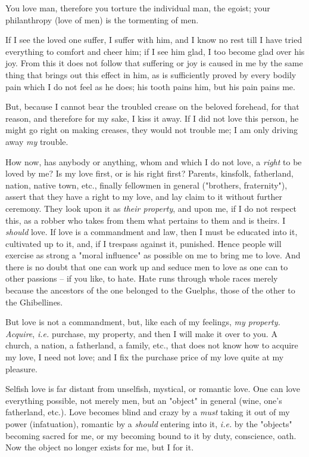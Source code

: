 You love man, therefore you torture the individual man, the egoist; your 
philanthropy (love of men) is the tormenting of men.

If I see the loved one suffer, I suffer with him, and I know no rest till I 
have tried everything to comfort and cheer him; if I see him glad, I too 
become glad over his joy. From this it does not follow that suffering or joy 
is caused in me by the same thing that brings out this effect in him, as is 
sufficiently proved by every bodily pain which I do not feel as he does; his 
tooth pains him, but his pain pains me.

But, because I cannot bear the troubled crease on the beloved forehead, for 
that reason, and therefore for my sake, I kiss it away. If I did not love this 
person, he might go right on making creases, they would not trouble me; I am 
only driving away \textit{my} trouble.

How now, has anybody or anything, whom and which I do not love, a 
\textit{right} to be loved by me? Is my love first, or is his right first? 
Parents, kinsfolk, fatherland, nation, native town, etc., finally fellowmen in 
general ("{}brothers, fraternity"{}), assert that they have a right to my 
love, and lay claim to it without further ceremony. They look upon it as 
\textit{their property}, and upon me, if I do not respect this, as a robber 
who takes from them what pertains to them and is theirs. I \textit{should} 
love. If love is a commandment and law, then I must be educated into it, 
cultivated up to it, and, if I trespass against it, punished. Hence people 
will exercise as strong a "{}moral influence"{} as possible on me to bring me 
to love. And there is no doubt that one can work up and seduce men to love as 
one can to other passions -- if you like, to hate. Hate runs through whole 
races merely because the ancestors of the one belonged to the Guelphs, those 
of the other to the Ghibellines.

But love is not a commandment, but, like each of my feelings, \textit{my 
property. Acquire}, \textit{i.e.} purchase, my property, and then I will make 
it over to you. A church, a nation, a fatherland, a family, etc., that does 
not know how to acquire my love, I need not love; and I fix the purchase price 
of my love quite at my pleasure.

Selfish love is far distant from unselfish, mystical, or romantic love. One 
can love everything possible, not merely men, but an "{}object"{} in general 
(wine, one's fatherland, etc.). Love becomes blind and crazy by a 
\textit{must} taking it out of my power (infatuation), romantic by a 
\textit{should} entering into it, \textit{i.e.} by the "{}objects"{} becoming 
sacred for me, or my becoming bound to it by duty, conscience, oath. Now the 
object no longer exists for me, but I for it.


